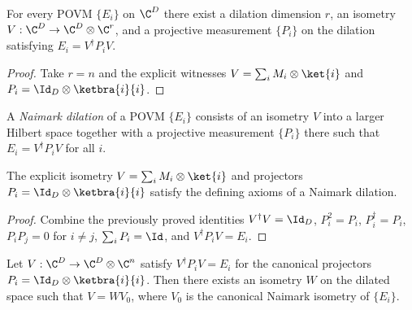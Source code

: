 \begin{theorem}\label{thm:exists_naimark_dilation}
    \leanok
    For every POVM $\{E_i\}$ on $\C^D$ there exist a dilation dimension $r$,
    an isometry $V:\C^D\to\C^D\otimes\C^r$, and a projective
    measurement $\{P_i\}$ on the dilation satisfying $E_i=V^\dagger P_iV$.
\end{theorem}

\begin{proof}
    \leanok
    Take $r=n$ and the explicit witnesses $V=\sum_iM_i\otimes\ket{i}$
    and $P_i=\Id_D\otimes\ketbra{i}{i}$.
\end{proof}

\begin{definition}
    \label{def:is_naimark_dilation}
    \leanok
    A \emph{Naimark dilation} of a POVM $\{E_i\}$ consists of an isometry
    $V$ into a larger Hilbert space together with a projective measurement
    $\{P_i\}$ there such that $E_i=V^\dagger P_iV$ for all $i$.
\end{definition}

\begin{theorem}
    \label{thm:is_naimark_dilation_naimark}
    \leanok
    The explicit isometry $V=\sum_iM_i\otimes\ket{i}$ and projectors
    $P_i=\Id_D\otimes\ketbra{i}{i}$ satisfy the defining axioms
    of a Naimark dilation.
\end{theorem}

\begin{proof}
    \leanok
    Combine the previously proved identities $V^\dagger V=\Id_D$,
    $P_i^2=P_i$, $P_i^\dagger=P_i$, $P_iP_j=0$ for $i\ne j$,
    $\sum_iP_i=\Id$, and $V^\dagger P_iV=E_i$.
\end{proof}

\begin{theorem}
    \label{thm:naimark_concrete_uniqueness}
    \leanok
    Let $V:\C^D\to\C^D\otimes\C^n$ satisfy
    $V^\dagger P_iV=E_i$ for the canonical projectors
    $P_i=\Id_D\otimes\ketbra{i}{i}$.
    Then there exists an isometry $W$ on the dilated space such that
    $V=WV_0$, where $V_0$ is the canonical Naimark isometry of $\{E_i\}$.
\end{theorem}

